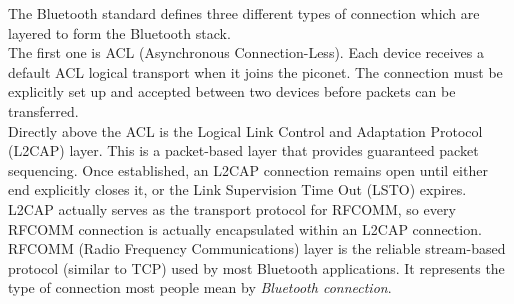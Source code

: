 \linebreak
The Bluetooth standard defines three different types of connection which are layered to form the Bluetooth stack.\\
The first one is ACL (Asynchronous Connection-Less). Each device receives a default ACL logical transport when it joins the piconet. The connection must be explicitly set up and accepted between two devices before packets can be transferred.\\
Directly above the ACL is the Logical Link Control and Adaptation Protocol (L2CAP) layer. This is a packet-based layer that provides guaranteed packet sequencing. Once established, an L2CAP connection remains open until either end explicitly closes it, or the Link Supervision Time Out (LSTO) expires.\\
L2CAP actually serves as the transport protocol for RFCOMM, so every RFCOMM connection is actually encapsulated within an L2CAP connection.\\
RFCOMM (Radio Frequency Communications) layer is the reliable stream-based protocol (similar to TCP) used by most Bluetooth applications. It represents the type of connection most people mean by \textit{Bluetooth connection}. 

